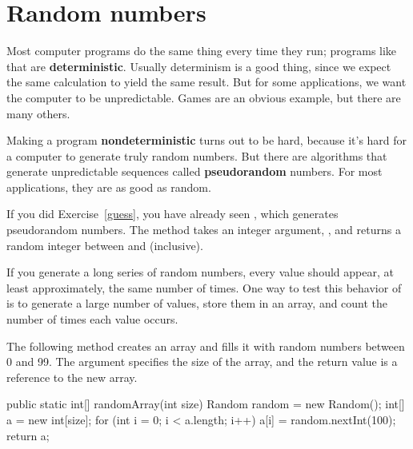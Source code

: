 \section{Random numbers}
\label{random}


Most computer programs do the same thing every time they run; programs like that are {\bf deterministic}.
Usually determinism is a good thing, since we expect the same calculation to yield the same result.
But for some applications, we want the computer to be unpredictable.
Games are an obvious example, but there are many others.



Making a program {\bf nondeterministic} turns out to be hard, because it's hard for a computer to generate truly random numbers.
But there are algorithms that generate unpredictable sequences called {\bf pseudorandom} numbers.
For most applications, they are as good as random.



If you did Exercise~\ref{guess}, you have already seen , which generates pseudorandom numbers.
The method  takes an integer argument, , and returns a random integer between  and  (inclusive).

If you generate a long series of random numbers, every value should appear, at least approximately, the same number of times.
One way to test this behavior of  is to generate a large number of values, store them in an array, and count the number of times each value occurs.

The following method creates an  array and fills it with random numbers between 0 and 99.
The argument specifies the size of the array, and the return value is a reference to the new array.

\begin{code}
public static int[] randomArray(int size) {
    Random random = new Random();
    int[] a = new int[size];
    for (int i = 0; i < a.length; i++) {
        a[i] = random.nextInt(100);
    }
    return a;
}
\end{code}


